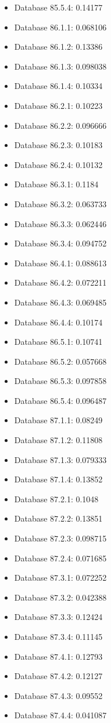 \begin{itemize}
\item Database 85.5.4: 0.14177
\item Database 86.1.1: 0.068106
\item Database 86.1.2: 0.13386
\item Database 86.1.3: 0.098038
\item Database 86.1.4: 0.10334
\item Database 86.2.1: 0.10223
\item Database 86.2.2: 0.096666
\item Database 86.2.3: 0.10183
\item Database 86.2.4: 0.10132
\item Database 86.3.1: 0.1184
\item Database 86.3.2: 0.063733
\item Database 86.3.3: 0.062446
\item Database 86.3.4: 0.094752
\item Database 86.4.1: 0.088613
\item Database 86.4.2: 0.072211
\item Database 86.4.3: 0.069485
\item Database 86.4.4: 0.10174
\item Database 86.5.1: 0.10741
\item Database 86.5.2: 0.057668
\item Database 86.5.3: 0.097858
\item Database 86.5.4: 0.096487
\item Database 87.1.1: 0.08249
\item Database 87.1.2: 0.11808
\item Database 87.1.3: 0.079333
\item Database 87.1.4: 0.13852
\item Database 87.2.1: 0.1048
\item Database 87.2.2: 0.13851
\item Database 87.2.3: 0.098715
\item Database 87.2.4: 0.071685
\item Database 87.3.1: 0.072252
\item Database 87.3.2: 0.042388
\item Database 87.3.3: 0.12424
\item Database 87.3.4: 0.11145
\item Database 87.4.1: 0.12793
\item Database 87.4.2: 0.12127
\item Database 87.4.3: 0.09552
\item Database 87.4.4: 0.041087

\end{itemize}
